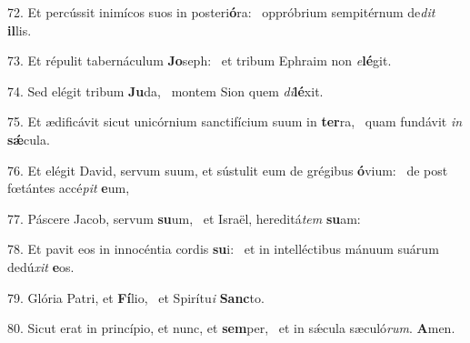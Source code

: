 72. Et percússit inimícos suos in posteri\textbf{ó}ra: \ast\  oppróbrium sempitérnum de\textit{dit} \textbf{il}lis.\

73. Et répulit tabernáculum \textbf{Jo}seph: \ast\  et tribum Ephraim non \textit{e}\textbf{lé}git.\

74. Sed elégit tribum \textbf{Ju}da, \ast\  montem Sion quem \textit{di}\textbf{lé}xit.\

75. Et ædificávit sicut unicórnium sanctifícium suum in \textbf{ter}ra, \ast\  quam fundávit \textit{in} \textbf{sǽ}cula.\

76. Et elégit David, servum suum, et sústulit eum de grégibus \textbf{ó}vium: \ast\  de post fœtántes accé\textit{pit} \textbf{e}um,\

77. Páscere Jacob, servum \textbf{su}um, \ast\  et Israël, hereditá\textit{tem} \textbf{su}am:\

78. Et pavit eos in innocéntia cordis \textbf{su}i: \ast\  et in intelléctibus mánuum suárum dedú\textit{xit} \textbf{e}os.\

79. Glória Patri, et \textbf{Fí}lio, \ast\  et Spirítu\textit{i} \textbf{Sanc}to.\

80. Sicut erat in princípio, et nunc, et \textbf{sem}per, \ast\  et in sǽcula sæculó\textit{rum}. \textbf{A}men.\

